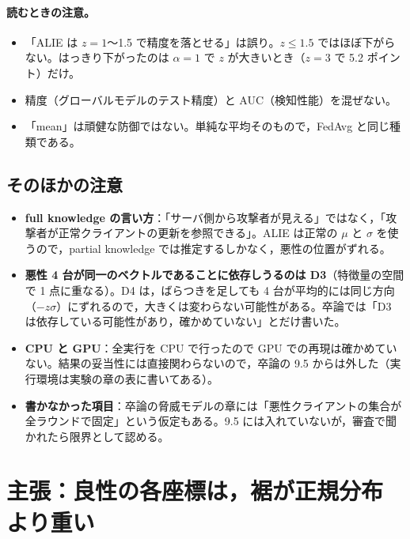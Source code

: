 \documentclass[a4j, dvipdfmx]{jsarticle}  %
\begin{document}
\paragraph{読むときの注意。}
\begin{itemize}
  \item 「ALIE は $z = 1$〜1.5 で精度を落とせる」は誤り。$z \le 1.5$ ではほぼ下がらない。はっきり下がったのは $\alpha = 1$ で $z$ が大きいとき（$z = 3$ で 5.2 ポイント）だけ。
  \item 精度（グローバルモデルのテスト精度）と AUC（検知性能）を混ぜない。
  \item 「mean」は頑健な防御ではない。単純な平均そのもので，FedAvg と同じ種類である。
\end{itemize}

\subsection{そのほかの注意}

\begin{itemize}
  \item \textbf{full knowledge の言い方}：「サーバ側から攻撃者が見える」ではなく，「攻撃者が正常クライアントの更新を参照できる」。ALIE は正常の $\mu$ と $\sigma$ を使うので，partial knowledge では推定するしかなく，悪性の位置がずれる。
  \item \textbf{悪性 4 台が同一のベクトルであることに依存しうるのは D3}（特徴量の空間で 1 点に重なる）。D4 は，ばらつきを足しても 4 台が平均的には同じ方向（$-z\sigma$）にずれるので，大きくは変わらない可能性がある。卒論では「D3 は依存している可能性があり，確かめていない」とだけ書いた。
  \item \textbf{CPU と GPU}：全実行を CPU で行ったので GPU での再現は確かめていない。結果の妥当性には直接関わらないので，卒論の 9.5 からは外した（実行環境は実験の章の表に書いてある）。
  \item \textbf{書かなかった項目}：卒論の脅威モデルの章には「悪性クライアントの集合が全ラウンドで固定」という仮定もある。9.5 には入れていないが，審査で聞かれたら限界として認める。
\end{itemize}

\section{主張：良性の各座標は，裾が正規分布より重い}
\label{sec:claim-tail}
\end{document}
